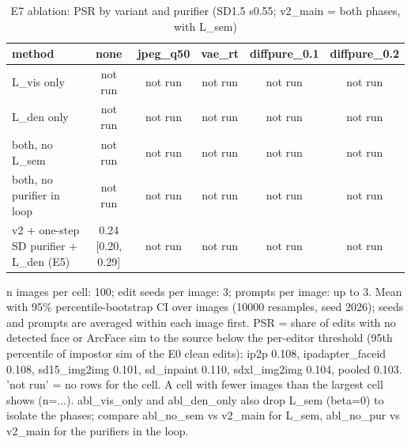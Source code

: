 \begin{table}[t]
\centering
\small
\begin{tabular}{lccccc}
\toprule
method & none & jpeg\_q50 & vae\_rt & diffpure\_0.1 & diffpure\_0.2 \\
\midrule
L\_vis only & not run & not run & not run & not run & not run \\
L\_den only & not run & not run & not run & not run & not run \\
both, no L\_sem & not run & not run & not run & not run & not run \\
both, no purifier in loop & not run & not run & not run & not run & not run \\
v2 + one-step SD purifier + L\_den (E5) & 0.24 [0.20, 0.29] & not run & not run & not run & not run \\
\bottomrule
\end{tabular}
\caption{E7 ablation: PSR by variant and purifier (SD1.5 s0.55; v2\_main = both phases, with L\_sem)}
\label{tab:e7}
\par\footnotesize n images per cell: 100; edit seeds per image: 3; prompts per image: up to 3. Mean with 95\% percentile-bootstrap CI over images (10000 resamples, seed 2026); seeds and prompts are averaged within each image first. PSR = share of edits with no detected face or ArcFace sim to the source below the per-editor threshold (95th percentile of impostor sim of the E0 clean edits): ip2p 0.108, ipadapter\_faceid 0.108, sd15\_img2img 0.101, sd\_inpaint 0.110, sdxl\_img2img 0.104, pooled 0.103. 'not run' = no rows for the cell. A cell with fewer images than the largest cell shows (n=...). abl\_vis\_only and abl\_den\_only also drop L\_sem (beta=0) to isolate the phases; compare abl\_no\_sem vs v2\_main for L\_sem, abl\_no\_pur vs v2\_main for the purifiers in the loop.
\end{table}
